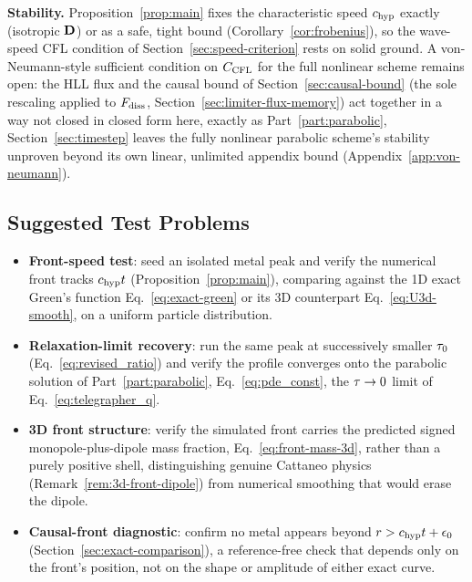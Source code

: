 \textbf{Stability.} Proposition~\ref{prop:main} fixes the characteristic
speed $c_{\rm hyp}$ exactly (isotropic $\mathbf{D}$) or as a safe, tight bound
(Corollary~\ref{cor:frobenius}), so the wave-speed CFL condition of
Section~\ref{sec:speed-criterion} rests on solid ground. A
von-Neumann-style sufficient condition on $C_{\mathrm{CFL}}$ for the full nonlinear
scheme remains open: the HLL flux and the causal bound of
Section~\ref{sec:causal-bound} (the sole rescaling applied to
$F_{\rm diss}$, Section~\ref{sec:limiter-flux-memory}) act together in a
way not closed in closed form here, exactly as Part~\ref{part:parabolic},
Section~\ref{sec:timestep} leaves the fully nonlinear parabolic scheme's
stability unproven beyond its own linear, unlimited appendix bound
(Appendix~\ref{app:von-neumann}).

\subsection{Suggested Test Problems}
\begin{itemize}
  \item \textbf{Front-speed test}: seed an isolated metal peak and verify
        the numerical front tracks $c_{\rm hyp} t$ (Proposition~\ref{prop:main}),
        comparing against the 1D exact Green's function
        Eq.~\eqref{eq:exact-green} or its 3D counterpart
        Eq.~\eqref{eq:U3d-smooth}, on a uniform particle distribution.
  \item \textbf{Relaxation-limit recovery}: run the same peak at
        successively smaller $\tau_0$ (Eq.~\eqref{eq:revised_ratio})
        and verify the profile converges onto the parabolic
         solution of Part~\ref{part:parabolic},
        Eq.~\eqref{eq:pde_const}, the $\tau\to0$ limit of
        Eq.~\eqref{eq:telegrapher_q}.
  \item \textbf{3D front structure}: verify the simulated front carries
        the predicted signed monopole-plus-dipole mass fraction,
        Eq.~\eqref{eq:front-mass-3d}, rather than a purely positive
        shell, distinguishing genuine Cattaneo physics
        (Remark~\ref{rem:3d-front-dipole}) from numerical smoothing that
        would erase the dipole.
  \item \textbf{Causal-front diagnostic}: confirm no metal appears beyond
        $r>c_{\rm hyp} t+\epsilon_0$ (Section~\ref{sec:exact-comparison}), a
        reference-free check that depends only on the front's position,
        not on the shape or amplitude of either exact curve.
\end{itemize}
